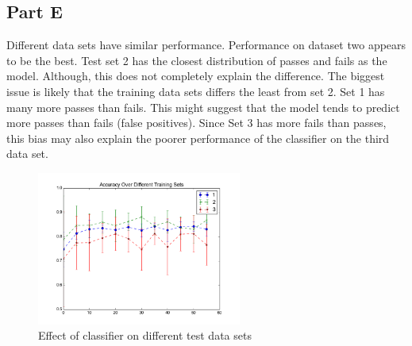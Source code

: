 \subsection{Part E}
Different data sets have similar performance.  Performance on dataset two appears to be the best.  Test set 2 has the closest distribution of passes and fails as the model.  Although, this does not completely explain the difference.  The biggest issue is likely that the training data sets differs the least from set 2.  Set 1 has many more passes than fails.  This might suggest that the model tends to predict more passes than fails (false positives).  Since Set 3 has more fails than passes, this bias may also explain the poorer performance of the classifier on the third data set.
\begin{figure}[h]
	\centering
	\includegraphics[width=0.6\textwidth]{../train1/data_sets.png}
	\caption{Effect of classifier on different test data sets}
\end{figure}